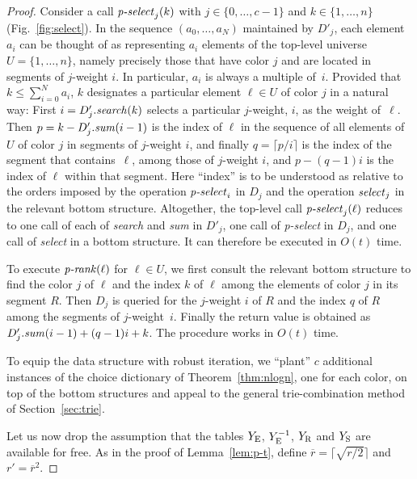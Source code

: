 \documentclass[envcountsame,envcountsect,undated,nolinenumbers]{lnthi}
\def\Tvn#1{\hbox{\textit{#1\/}}}
\def\Tceil#1{\lceil #1\rceil}
\def\rbar{\overline{r}}
\begin{document}
\begin{proof}
Consider a call $\Tvn{p-select}_j(k)$
with $j\in\{0,\ldots,c-1\}$ and
$k\in\{1,\ldots,n\}$
(Fig.~\ref{fig:select}).
In the sequence $(a_0,\ldots,a_N)$ maintained
by $D'_j$, each element $a_i$ can be thought of
as representing $a_i$ elements of the top-level
universe $U=\{1,\ldots,n\}$, namely precisely those
that have color $j$ and
are located in segments of $j$-weight $i$.
In particular, $a_i$ is always a multiple of~$i$.
Provided that $k\le\sum_{i=0}^N a_i$,
$k$ designates a particular element $\ell\in U$
of color $j$ in a natural way:
First $i=D'_j.\Tvn{search}(k)$ selects
a particular $j$-weight, $i$, as the weight of~$\ell$.
Then $p=k-D'_j.\Tvn{sum}(i-1)$ is the index of
$\ell$ in the sequence of all elements of $U$
of color $j$ in segments of $j$-weight $i$, and finally
$q=\Tceil{{p/i}}$ is the index of the segment that contains~$\ell$,
among those of $j$-weight $i$,
and $p-(q-1)i$ is the index of $\ell$
within that segment.
Here ``index'' is to be understood as relative
to the orders imposed by the operation
$\Tvn{p-select}_i$ in $D_j$ and the
operation $\Tvn{select}_j$ in the
relevant bottom structure.
Altogether, the top-level call
$\Tvn{p-select}_j(\ell)$ reduces to one call of
each of \Tvn{search} and \Tvn{sum} in $D'_j$,
one call of \Tvn{p-select} in $D_j$, and one
call of \Tvn{select} in a bottom structure.
It can therefore be executed in $O(t)$ time.

To execute $\Tvn{p-rank}(\ell)$ for
$\ell\in U$, we first consult the relevant
bottom structure to find the color $j$
of $\ell$ and the index $k$ of $\ell$
among the elements of color $j$ in its segment $R$.
Then $D_j$ is queried for the $j$-weight $i$ of $R$ 
and the index $q$ of $R$ among the segments
of $j$-weight~$i$.
Finally the return value is obtained as
$D'_j.\Tvn{sum}(i-1)+(q-1)i+k$.
The procedure works in $O(t)$ time.

To equip the data structure with robust iteration,
we ``plant'' $c$ additional
instances of the choice dictionary of
Theorem~\ref{thm:nlogn}, one for each
color, on top of the bottom structures and
appeal to the general
trie-combination method of Section~\ref{sec:trie}.

Let us now drop the assumption that the
tables $Y_{\mbox{\scriptsize E}}$, $Y^{-1}_{\mbox{\scriptsize E}}$, $Y_{\mbox{\scriptsize R}}$
and $Y_{\mbox{\scriptsize S}}$ are available for free.
As in the proof of Lemma~\ref{lem:p-t},
define $\rbar=\Tceil{\sqrt{{r/2}}}$ and $r'=\rbar^2$.


\end{proof}
\end{document}

